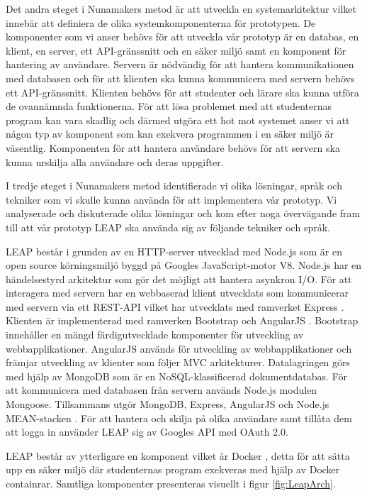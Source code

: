 \documentclass[a4paper,11pt]{article}
\begin{document}
{Det andra steget i Nunamakers metod är att utveckla en systemarkitektur vilket innebär att definiera de olika systemkomponenterna för prototypen. De komponenter som vi anser behövs för att utveckla vår prototyp är en databas,  en klient, en server, ett API-gränssnitt och en säker miljö samt en komponent för hantering av användare. Servern är nödvändig för att hantera kommunikationen med databasen och för att klienten ska kunna kommunicera med servern behövs ett API-gränssnitt. Klienten behövs för att studenter och lärare ska kunna utföra de ovannämnda funktionerna. För att lösa problemet med att studenternas program kan vara skadlig och därmed utgöra ett hot mot systemet anser vi att någon typ av komponent som kan exekvera programmen i en säker miljö är väsentlig. Komponenten för att hantera användare behövs för att servern ska kunna urskilja alla användare och deras uppgifter.

I tredje steget i Nunamakers metod identifierade vi olika lösningar, språk och tekniker som vi skulle kunna använda för att implementera vår prototyp. Vi analyserade och diskuterade olika lösningar och kom efter noga övervägande fram till att vår prototyp LEAP ska använda sig av följande tekniker och språk. 

LEAP består i grunden av en HTTP-server utvecklad med Node.js \cite{nodejs} som är en open source körningsmiljö byggd på Googles JavaScript-motor V8. Node.js har en händelsestyrd arkitektur som gör det möjligt att hantera asynkron I/O. För att interagera med servern har en webbaserad klient utvecklats som kommunicerar med servern via ett REST-API vilket har utvecklats med ramverket Express \cite{express}. Klienten är implementerad med ramverken Bootstrap \cite{bootstrap} och AngularJS \cite{angularjs}. Bootstrap innehåller en mängd färdigutvecklade komponenter för utveckling av webbapplikationer. AngularJS används för utveckling av webbapplikationer och främjar utveckling av klienter som följer MVC arkitekturer. Datalagringen görs med hjälp av MongoDB \cite{mongodb} som är en NoSQL-klassificerad dokumentdatabas. För att kommunicera med databasen från servern används Node.js modulen Mongoose.  Tillsammans utgör MongoDB, Express, AngularJS och Node.js MEAN-stacken \cite{mean_stack}. För att hantera och skilja på olika användare samt tillåta dem att logga in använder LEAP sig av Googles API med OAuth 2.0.

LEAP består av ytterligare en komponent vilket är Docker \cite{docker}, detta för att sätta upp en säker miljö där studenternas program exekveras med hjälp av Docker containrar. Samtliga komponenter presenteras visuellt i figur \ref{fig:LeapArch}.

}
\end{document}
